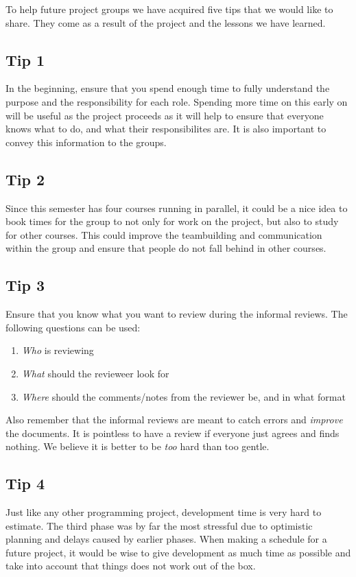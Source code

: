 \documentclass{article}
\begin{document}
    To help future project groups we have acquired five tips that we would like to share.
    They come as a result of the project and the lessons we have learned.
    
    \subsection{Tip 1}
        In the beginning, ensure that you spend enough time to fully understand the purpose and the 
        responsibility for each role. Spending more time on this early on will be useful as the project
        proceeds as it will help to ensure that everyone knows what to do, and what their responsibilites are. It is also important to convey this information to the groups.
        
    \subsection{Tip 2}
        Since this semester has four courses running in parallel, it could be a nice idea
        to book times for the group to not only for work on the project, but also to study
        for other courses. This could improve the teambuilding and communication within the
        group and ensure that people do not fall behind in other courses.
    
    \subsection{Tip 3}
        Ensure that you know what you want to review during the informal reviews. The following
        questions can be used:
        \begin{enumerate}
            \item \emph{Who} is reviewing
            \item \emph{What} should the revieweer look for
            \item \emph{Where} should the comments/notes from the reviewer be, and in what format
        \end{enumerate}
        Also remember that the informal reviews are meant to catch errors and \emph{improve}
        the documents. It is pointless to have a review if everyone just agrees and finds nothing. 
        We believe it is better to be \emph{too} hard than too gentle.
        
    \subsection{Tip 4}
        Just like any other programming project, development time is very hard to estimate. 
        The third phase was by far the most stressful due to optimistic planning and delays caused by earlier phases. 
        When making a schedule for a future project, it would be wise to give development as much time as possible and 
        take into account that things does not work out of the box.
        
\end{document}
